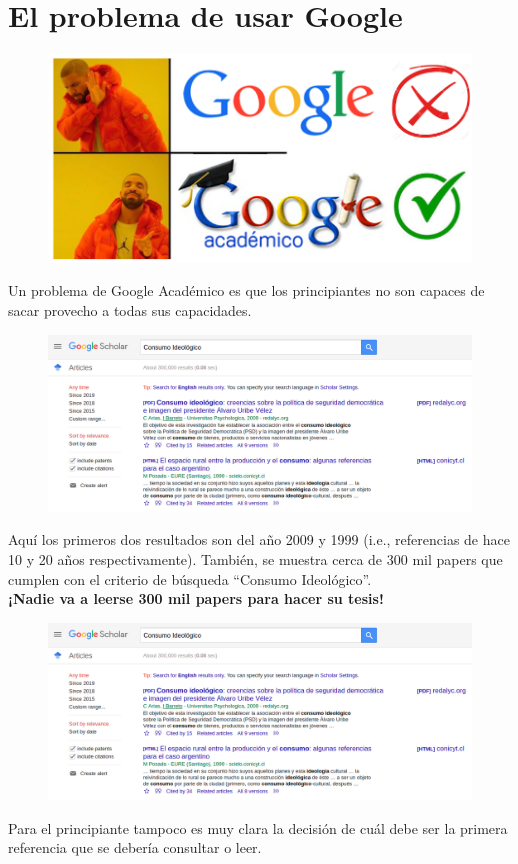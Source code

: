 \documentclass[9pt]{beamer}
\begin{document}
\section{El problema de usar Google}
\begin{frame}
\begin{figure}
\centering
 \includegraphics[width=.6\textwidth]{b1}
\end{figure}
\pause
Un problema de Google Académico es que los principiantes no son capaces de sacar provecho a todas sus capacidades.
\end{frame}



\begin{frame}
\begin{figure}
\centering
 \includegraphics[width=1\textwidth]{b2}
\end{figure}
Aquí los primeros dos resultados son del año 2009 y 1999 (i.e., referencias de hace 10 y 20 años respectivamente). También, se muestra cerca de 300 mil papers que cumplen con el criterio de búsqueda ``Consumo Ideológico''.\\
\pause
\vspace{0.3cm}
\textbf{¡Nadie va a leerse 300 mil papers para hacer su tesis!}
\end{frame}

\begin{frame}
\begin{figure}
\centering
 \includegraphics[width=.9\textwidth]{b2}
\end{figure}
Para el principiante tampoco es muy clara la decisión de cuál debe ser la primera referencia que se debería consultar o leer.
\end{frame}
\end{document}

